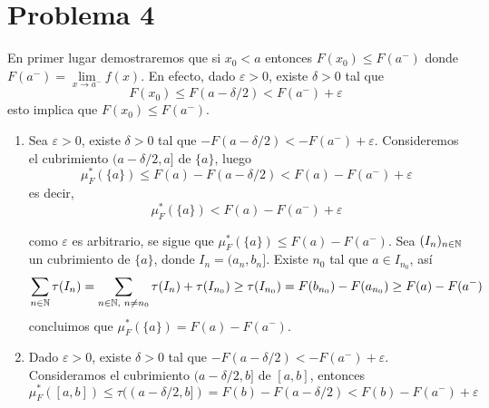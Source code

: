 \documentclass{article}
\begin{document}
\section*{Problema 4}
\noindent En primer lugar demostraremos que si $x_{0}<a$ entonces $F(x_{0})\leq F(a^{-})$ donde 
$F(a^{-})=\lim\limits_{x\to a^{-}}f(x)$. En efecto, dado $\varepsilon>0$, existe $\delta>0$ tal que
\begin{equation*}
    F(x_{0})\leq F(a-\delta/2)<F(a^{-})+\varepsilon
\end{equation*}
esto implica que $F(x_{0})\leq F(a^{-})$.
\begin{enumerate}
    \item Sea $\varepsilon>0$, existe $\delta>0$ tal que $-F(a-\delta/2)<-F(a^{-})+\varepsilon$. 
    Consideremos el cubrimiento $(a-\delta/2,a]$ de $\{a\}$, luego
    \begin{equation*}
        \mu_{F}^{*}(\{a\})\leq F(a)-F(a-\delta/2)<F(a)-F(a^{-})+\varepsilon
    \end{equation*}
    es decir,
    \begin{equation*}
        \mu_{F}^{*}(\{a\})<F(a)-F(a^{-})+\varepsilon
    \end{equation*}
    
    como $\varepsilon$ es arbitrario, se sigue que $\mu_{F}^{*}(\{a\})\leq F(a)-F(a^{-})$. Sea
    $(I_{n})_{n\in\mathbb{N}}$ un cubrimiento de $\{a\}$, donde $I_{n}=(a_{n},b_{n}]$. Existe $n_{0}$ 
    tal que $a\in I_{n_{0}}$, así
    \begin{equation*}
        \sum_{n\in\mathbb{N}}\tau(I_{n})=\sum_{n\in\mathbb{N},\hspace{1mm}n\neq n_{0}}\tau(I_{n})+\tau(I_{n_{0}})
        \geq\tau(I_{n_{0}})=F(b_{n_{0}})-F(a_{n_{0}})\geq F(a)-F(a^{-})
    \end{equation*}
    concluimos que $\mu_{F}^{*}(\{a\})=F(a)-F(a^{-})$.

    \item Dado $\varepsilon>0$, existe $\delta>0$ tal que $-F(a-\delta/2)<-F(a^{-})+\varepsilon$.
    Consideramos el cubrimiento $(a-\delta/2,b]$ de $[a,b]$, entonces
    \begin{equation*}
        \mu_{F}^{*}([a,b])\leq\tau((a-\delta/2,b])=F(b)-F(a-\delta/2)<F(b)-F(a^{-})+\varepsilon
    \end{equation*}


\end{enumerate}
\end{document}
